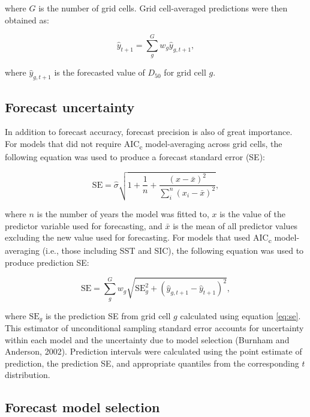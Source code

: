 \documentclass[12pt,]{book}
\theoremstyle{definition}
\theoremstyle{definition}
\theoremstyle{definition}
\theoremstyle{remark}
\begin{document}
\noindent
where \(G\) is the number of grid cells. Grid cell-averaged predictions
were then obtained as:

\begin{equation}
  \hat{y}_{t+1}=\sum_g^G w_g \hat{y}_{g,t+1},
\label{eq:grid-avg-fcst}
\end{equation}

\noindent
where \(\hat{y}_{g,t+1}\) is the forecasted value of \(D_{50}\) for grid
cell \(g\).

\subsection{Forecast uncertainty}\label{forecast-uncertainty}

\noindent
In addition to forecast accuracy, forecast precision is also of great
importance. For models that did not require AIC\textsubscript{c}
model-averaging across grid cells, the following equation was used to
produce a forecast standard error (SE):

\begin{equation}
  \text{SE}=\hat{\sigma} \sqrt{1 + \frac{1}{n} + \frac{(x-\bar{x})^2}{\sum_i^n(x_i-\bar{x})^2}},
\label{eq:se}
\end{equation}

\noindent
where \(n\) is the number of years the model was fitted to, \(x\) is the
value of the predictor variable used for forecasting, and \(\bar{x}\) is
the mean of all predictor values excluding the new value used for
forecasting. For models that used AIC\textsubscript{c} model-averaging
(i.e., those including SST and SIC), the following equation was used to
produce prediction SE:

\begin{equation}
  \text{SE}=\sum_g^G w_g \sqrt{\text{SE}_g^2+(\hat{y}_{g,t+1}-\hat{y}_{t+1})^2},
\label{eq:mod-avg-se}
\end{equation}

\noindent
where \(\text{SE}_g\) is the prediction SE from grid cell \(g\)
calculated using equation \eqref{eq:se}. This estimator of unconditional
sampling standard error accounts for uncertainty within each model and
the uncertainty due to model selection (Burnham and Anderson, 2002).
Prediction intervals were calculated using the point estimate of
prediction, the prediction SE, and appropriate quantiles from the
corresponding \(t\) distribution.

\subsection{Forecast model selection}\label{model-selection}
\end{document}

